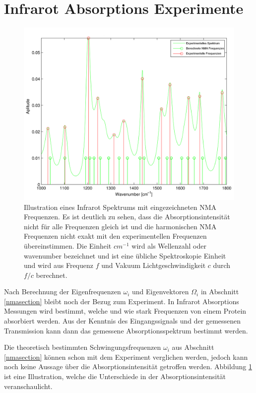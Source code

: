 \documentclass[a4paper,12pt]{article}
\begin{document}
\section{Infrarot Absorptions Experimente}
\begin{figure}[ht!]
 \centering
 \includegraphics[scale=0.2,keepaspectratio=true]{./spektrum_exp_nma.png}
 \caption{Illustration eines Infrarot Spektrums mit eingezeichneten NMA Frequenzen. Es ist deutlich zu sehen, dass die Absorptionsintensität nicht für alle Frequenzen gleich ist und die harmonischen 
  NMA Frequenzen nicht exakt mit den experimentellen Frequenzen übereinstimmen.
  Die Einheit $cm^{-1}$ wird als Wellenzahl oder wavenumber bezeichnet und ist eine übliche Spektroskopie Einheit und wird aus Frequenz $f$ und Vakuum Lichtgeschwindigkeit $c$ durch $f/c$ berechnet. 
  }
 \label{fig:nma_exp_comp}
\end{figure}
Nach Berechnung der Eigenfrequenzen $\omega_i$ und Eigenvektoren $\Omega_i$ in Abschnitt \ref{nmasection} bleibt noch der Bezug zum 
Experiment. In Infrarot Absorptions Messungen wird bestimmt, welche und wie stark Frequenzen von einem Protein absorbiert werden. Aus
der Kenntnis des Eingangssignals und der gemessenen Transmission kann dann das gemessene Absorptionsspektrum bestimmt werden. 

Die theoretisch bestimmten Schwingungsfrequenzen $\omega_i$ aus Abschnitt \ref{nmasection} können schon mit dem Experiment verglichen 
werden, jedoch kann noch keine Aussage über die Absorptionsintensität getroffen werden. Abbildung \ref{fig:nma_exp_comp} ist eine Illustration,
welche die Unterschiede in der Absorptionsintensität veranschaulicht.
\end{document}
